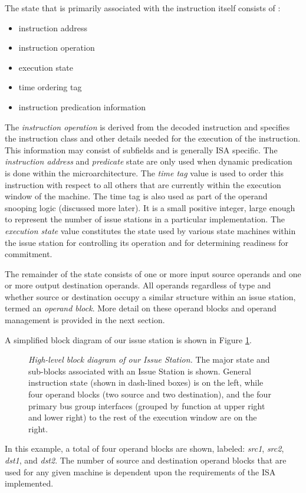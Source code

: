 \documentclass[10pt,twocolumn,dvips]{article}
\begin{document}
The state that is primarily associated with the instruction itself
consists of :
%
\begin{itemize}
\vspace{-0.10in}
\item{instruction address}
\vspace{-0.10in}
\item{instruction operation}
\vspace{-0.10in}
\item{execution state}
\vspace{-0.10in}
\item{time ordering tag}
\vspace{-0.10in}
\item{instruction predication information}
\vspace{-0.10in}
\end{itemize}   
%
The \textit{instruction operation} is derived from the decoded
instruction and specifies the instruction class and other
details needed for the execution of the instruction.
This information may consist of subfields and is generally ISA
specific.
The \textit{instruction address} and \textit{predicate} state
are only used when dynamic predication~\cite{undisclosed2}
is done within the microarchitecture.
The \textit{time tag} value is used to order this instruction
with respect to all others that are currently within the execution
window of the machine.
The time tag is also used as part of the operand snooping
logic (discussed more later).
It is a small positive integer, large enough to represent
the number of issue stations in a particular implementation.
The \textit{execution state} value constitutes the state
used by various state machines within the issue station
for controlling its operation and for determining readiness
for commitment.

The remainder of the state consists of one or more input
source operands and one or more output destination operands.
All operands regardless of type and whether source or destination
occupy a similar structure within an issue station, termed an
\textit{operand block}.
More detail on these operand blocks and operand management
is provided in the next section.

A simplified block diagram of our issue station is shown in 
Figure \ref{fig:issuestation}.
%
\begin{figure}
\caption{{\em High-level block diagram of our Issue Station.} 
\small{
The major state and sub-blocks associated with an Issue Station is shown.
General instruction state (shown in dash-lined boxes) is
on the left, while
four operand blocks (two source and two destination),
and the four primary bus group interfaces (grouped by function at
upper right and lower right) to the rest of the
execution window are on the right.
}
}
\label{fig:issuestation}
\end{figure}
%
In this example, a total of four operand blocks are shown, labeled:
\textit{src1}, 
\textit{src2}, 
\textit{dst1}, 
and \textit{dst2}.
The number of source and destination operand blocks that are
used for any given machine is dependent upon the requirements
of the ISA implemented.
%
%
\end{document}
